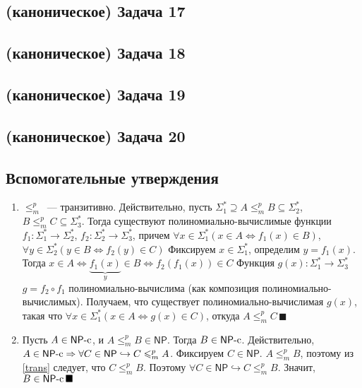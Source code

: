 \documentclass[a4paper]{article}
\def\NP{{\mathsf{NP}}}
\def\NPc{{\mathsf{NP}}\text{-}{\rm c}}
\begin{document}
\subsection*{(каноническое) Задача 17}
\subsection*{(каноническое) Задача 18}
\subsection*{(каноническое) Задача 19}
\subsection*{(каноническое) Задача 20}
\subsection*{Вспомогательные утверждения}
\begin{enumerate}
\item \label{trans} $\leqslant_m^p$~--- транзитивно. Действительно, пусть $\Sigma_1^*\supseteq A\leqslant_m^p B\subseteq \Sigma_2^*$, $B\leqslant_m^p C\subseteq\Sigma_3^*$. Тогда существуют полиномиально-вычислимые функции $f_1\colon \Sigma_1^*\to \Sigma_2^*$, $f_2\colon \Sigma_2^*\to \Sigma_3^*$, причем $\forall x\in\Sigma_1^*\left(x\in A\Leftrightarrow f_1(x)\in B\right)$, $\forall y\in \Sigma_2^*\left(y\in B\Leftrightarrow f_2(y)\in C\right)$\newline
Фиксируем $x\in\Sigma_1^*$, определим $y=f_1(x)$. Тогда $x\in A\Leftrightarrow \underbrace{f_1(x)}_y\in B\Leftrightarrow f_2(f_1(x))\in C$\newline
Функция $g(x)\colon \Sigma_1^*\to\Sigma_3^*$ $g=f_2\circ f_1$ полиномиально-вычислима (как композиция полиномиально-вычислимых). Получаем, что существует полиномиально-вычислимая $g(x)$, такая что $\forall x\in\Sigma_1^*\left(x\in A\Leftrightarrow g(x)\in C\right)$, откуда $A\leqslant_m^p C\,\blacksquare$
\item \label{abnpc} Пусть $A\in\NPc$, и $A\leqslant_m^p B\in \NP$. Тогда $B\in \NPc$. Действительно, $A\in\NPc\Rightarrow\forall C\in \NP\hookrightarrow C\leqslant_m^p A$. Фиксируем $C\in\NP$. $A\leqslant_m^p B$, поэтому из \ref{trans} следует, что $C\leqslant_m^p B$. Поэтому $\forall C\in\NP\hookrightarrow C\leqslant_m^p B$. Значит, $B\in\NPc\,\blacksquare$
\end{enumerate}
\end{document}
